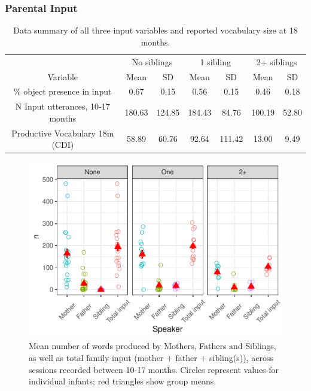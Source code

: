 \documentclass[
  man,floatsintext]{apa6}
\begin{document}
\hypertarget{parental-input}{%
\subsubsection{Parental Input}\label{parental-input}}

\begin{table}

\caption{\label{tab:table-data-summary}Data summary of all three input variables and reported vocabulary size at 18 months.}
\centering
\begin{tabular}[t]{ccccccc}
\toprule
\multicolumn{1}{c}{ } & \multicolumn{2}{c}{No siblings} & \multicolumn{2}{c}{1 sibling} & \multicolumn{2}{c}{2+ siblings} \\
\cmidrule(l{3pt}r{3pt}){2-3} \cmidrule(l{3pt}r{3pt}){4-5} \cmidrule(l{3pt}r{3pt}){6-7}
\multicolumn{1}{c}{Variable} & \multicolumn{1}{c}{Mean} & \multicolumn{1}{c}{SD} & \multicolumn{1}{c}{Mean} & \multicolumn{1}{c}{SD} & \multicolumn{1}{c}{Mean} & \multicolumn{1}{c}{SD} \\
\cmidrule(l{3pt}r{3pt}){1-1} \cmidrule(l{3pt}r{3pt}){2-2} \cmidrule(l{3pt}r{3pt}){3-3} \cmidrule(l{3pt}r{3pt}){4-4} \cmidrule(l{3pt}r{3pt}){5-5} \cmidrule(l{3pt}r{3pt}){6-6} \cmidrule(l{3pt}r{3pt}){7-7}
\% object presence in input & 0.67 & 0.15 & 0.56 & 0.15 & 0.46 & 0.18\\
N Input utterances, 10-17 months & 180.63 & 124.85 & 184.43 & 84.76 & 100.19 & 52.80\\
Productive Vocabulary 18m (CDI) & 58.89 & 60.76 & 92.64 & 111.42 & 13.00 & 9.49\\
\bottomrule
\end{tabular}
\end{table}

\begin{figure}
\centering
\includegraphics{SiblingsStudyText_files/figure-latex/Figure-Speaker-count-1.pdf}
\caption{\label{fig:Figure-Speaker-count}Mean number of words produced by Mothers, Fathers and Siblings, as well as total family input (mother + father + sibling(s)), across sessions recorded between 10-17 months. Circles represent values for individual infants; red triangles show group means.}
\end{figure}
\end{document}

